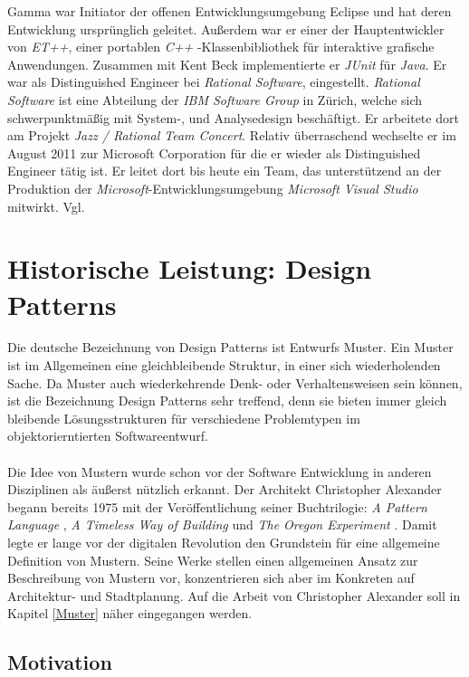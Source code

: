\documentclass[fontsize=11pt,a4paper,final]{scrreprt}[2003/01/01]
\begin{document}
Gamma war Initiator der offenen Entwicklungsumgebung Eclipse und hat deren Entwicklung ursprünglich geleitet. Außerdem war er einer der Hauptentwickler von \textit{ET++}, einer portablen \textit{C++} -Klassenbibliothek für interaktive grafische Anwendungen. Zusammen mit Kent Beck implementierte er \textit{JUnit} für \textit{Java}. Er war als Distinguished Engineer bei \textit{Rational Software}, eingestellt. \textit{Rational Software} ist eine Abteilung der \textit{IBM Software Group} in Zürich, welche sich schwerpunktmäßig mit System-, und Analysedesign beschäftigt. Er arbeitete dort am Projekt \textit{Jazz / Rational Team Concert}. Relativ überraschend wechselte er im August 2011 zur Microsoft Corporation für die er wieder als Distinguished Engineer tätig ist. Er leitet dort bis heute ein Team, das unterstützend an der Produktion der\textit{ Microsoft}-Entwicklungsumgebung \textit{Microsoft Visual Studio} mitwirkt. Vgl. \cite{ErichGammaWikiDe}

\chapter{Historische Leistung: Design Patterns}\label{se:Historische Leistung: Design Patterns}
Die deutsche Bezeichnung von Design Patterns ist Entwurfs Muster. Ein Muster ist im Allgemeinen eine gleichbleibende Struktur, in einer sich wiederholenden Sache. Da Muster auch wiederkehrende Denk- oder Verhaltensweisen sein können, ist die Bezeichnung Design Patterns sehr treffend, denn sie bieten immer gleich bleibende Lösungsstrukturen für verschiedene Problemtypen im objektorierntierten Softwareentwurf.
\\ \\
Die Idee von Mustern wurde schon vor der Software Entwicklung in anderen Disziplinen als äußerst nützlich erkannt. Der Architekt \mbox{Christopher} \mbox{Alexander} begann bereits 1975 mit der Veröffentlichung seiner Buchtrilogie: \textit{A Pattern Language} \cite{Alexander1979}, \textit{A Timeless Way of Building} \cite{Alexander1977} und \textit{The Oregon Experiment} \cite{Alexander1975}. Damit legte er lange vor der digitalen Revolution den Grundstein für eine allgemeine Definition von Mustern. Seine Werke stellen einen allgemeinen Ansatz zur Beschreibung von Mustern vor, konzentrieren sich aber im Konkreten auf Architektur- und Stadtplanung. Auf die Arbeit von Christopher Alexander soll in Kapitel \ref{Muster} näher eingegangen werden.

\section{Motivation}\label{se:Motivation}
\end{document}
